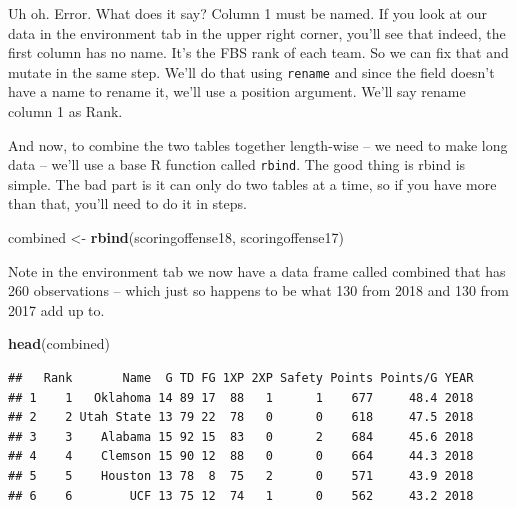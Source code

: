 \documentclass[]{book}
\newenvironment{Shaded}{\begin{snugshade}}{\end{snugshade}}
\newcommand{\KeywordTok}[1]{\textcolor[rgb]{0.13,0.29,0.53}{\textbf{#1}}}
\newcommand{\DataTypeTok}[1]{\textcolor[rgb]{0.13,0.29,0.53}{#1}}
\newcommand{\DecValTok}[1]{\textcolor[rgb]{0.00,0.00,0.81}{#1}}
\newcommand{\StringTok}[1]{\textcolor[rgb]{0.31,0.60,0.02}{#1}}
\newcommand{\OperatorTok}[1]{\textcolor[rgb]{0.81,0.36,0.00}{\textbf{#1}}}
\newcommand{\NormalTok}[1]{#1}
\begin{document}
Uh oh. Error. What does it say? Column 1 must be named. If you look at
our data in the environment tab in the upper right corner, you'll see
that indeed, the first column has no name. It's the FBS rank of each
team. So we can fix that and mutate in the same step. We'll do that
using \texttt{rename} and since the field doesn't have a name to rename
it, we'll use a position argument. We'll say rename column 1 as Rank.

\begin{Shaded}
\end{Shaded}

And now, to combine the two tables together length-wise -- we need to
make long data -- we'll use a base R function called \texttt{rbind}. The
good thing is rbind is simple. The bad part is it can only do two tables
at a time, so if you have more than that, you'll need to do it in steps.

\begin{Shaded}
\begin{Highlighting}[]
\NormalTok{combined <-}\StringTok{ }\KeywordTok{rbind}\NormalTok{(scoringoffense18, scoringoffense17)}
\end{Highlighting}
\end{Shaded}

Note in the environment tab we now have a data frame called combined
that has 260 observations -- which just so happens to be what 130 from
2018 and 130 from 2017 add up to.

\begin{Shaded}
\begin{Highlighting}[]
\KeywordTok{head}\NormalTok{(combined)}
\end{Highlighting}
\end{Shaded}

\begin{verbatim}
##   Rank       Name  G TD FG 1XP 2XP Safety Points Points/G YEAR
## 1    1   Oklahoma 14 89 17  88   1      1    677     48.4 2018
## 2    2 Utah State 13 79 22  78   0      0    618     47.5 2018
## 3    3    Alabama 15 92 15  83   0      2    684     45.6 2018
## 4    4    Clemson 15 90 12  88   0      0    664     44.3 2018
## 5    5    Houston 13 78  8  75   2      0    571     43.9 2018
## 6    6        UCF 13 75 12  74   1      0    562     43.2 2018
\end{verbatim}
\end{document}
